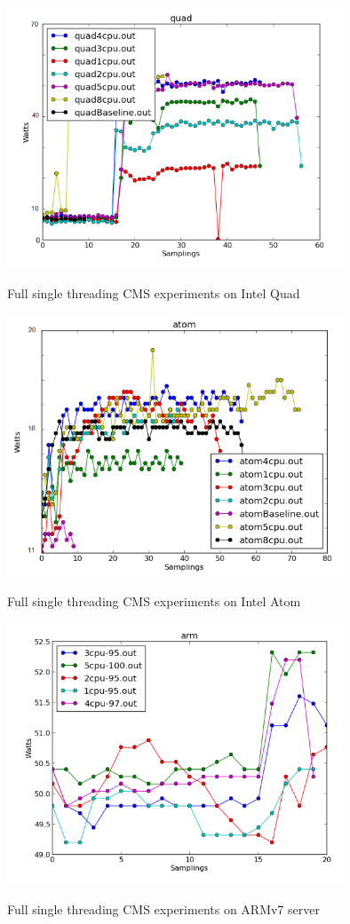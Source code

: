 \begin{figure}[h!]
  \centering
    \includegraphics[width=100mm]{"img/aalto/aalto_total_quad"}
    \label{fig:nf_ss}
    \caption{Full single threading CMS experiments on Intel Quad}
\end{figure}

\begin{figure}[h!]
  \centering
    \includegraphics[width=100mm]{"img/aalto/aalto_total_atom"}
    \label{fig:nf_ss}
    \caption{Full single threading CMS experiments on Intel Atom}
\end{figure}

\begin{figure}[h!]
  \centering
    \includegraphics[width=100mm]{"img/aalto/aalto_total_arm"}
    \label{fig:nf_ss}
    \caption{Full single threading CMS experiments on ARMv7 server}
\end{figure}


